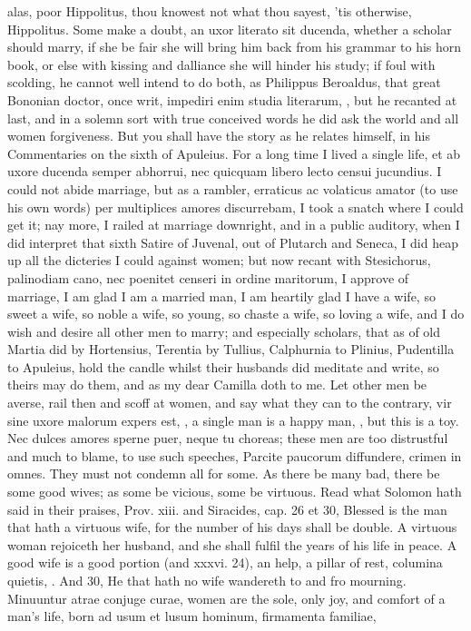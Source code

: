 {alas, poor Hippolitus, thou knowest not what thou sayest, 'tis
otherwise, Hippolitus. Some make a doubt, an uxor literato sit
ducenda, whether a scholar should marry, if she be fair she will bring
him back from his grammar to his horn book, or else with kissing and
dalliance she will hinder his study; if foul with scolding, he cannot
well intend to do both, as Philippus Beroaldus, that great Bononian
doctor, once writ, impediri enim studia literarum, \etc{}, but he recanted
at last, and in a solemn sort with true conceived words he did ask the
world and all women forgiveness. But you shall have the story as he
relates himself, in his Commentaries on the sixth of Apuleius. For a
long time I lived a single life, et ab uxore ducenda semper abhorrui,
nec quicquam libero lecto censui jucundius. I could not abide marriage,
but as a rambler, erraticus ac volaticus amator (to use his own words)
per multiplices amores discurrebam, I took a snatch where I could get
it; nay more, I railed at marriage downright, and in a public auditory,
when I did interpret that sixth Satire of Juvenal, out of Plutarch and
Seneca, I did heap up all the dicteries I could against women; but now
recant with Stesichorus, palinodiam cano, nec poenitet censeri in
ordine maritorum, I approve of marriage, I am glad I am a married
man, I am heartily glad I have a wife, so sweet a wife, so noble a
wife, so young, so chaste a wife, so loving a wife, and I do wish and
desire all other men to marry; and especially scholars, that as of old
Martia did by Hortensius, Terentia by Tullius, Calphurnia to Plinius,
Pudentilla to Apuleius, hold the candle whilst their husbands did
meditate and write, so theirs may do them, and as my dear Camilla doth
to me. Let other men be averse, rail then and scoff at women, and say
what they can to the contrary, vir sine uxore malorum expers est, \etc{},
a single man is a happy man, \etc{}, but this is a toy. Nec dulces
amores sperne puer, neque tu choreas; these men are too distrustful and
much to blame, to use such speeches, Parcite paucorum diffundere,
crimen in omnes. They must not condemn all for some. As there be many
bad, there be some good wives; as some be vicious, some be virtuous.
Read what Solomon hath said in their praises, Prov. xiii. and
Siracides, cap. 26 et 30, Blessed is the man that hath a virtuous wife,
for the number of his days shall be double. A virtuous woman rejoiceth
her husband, and she shall fulfil the years of his life in peace. A
good wife is a good portion (and xxxvi. 24), an help, a pillar of rest,
columina quietis,   .
And 30, He that hath no wife wandereth to and fro mourning. Minuuntur
atrae conjuge curae, women are the sole, only joy, and comfort of a
man's life, born ad usum et lusum hominum, firmamenta familiae,

}
